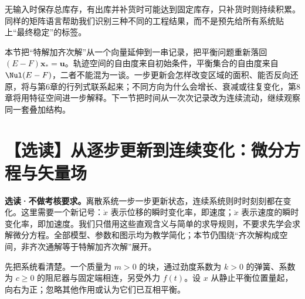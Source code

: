 \documentclass[a4paper,12pt,twoside,openany,fontset=none]{ctexbook}
\renewcommand{\geq}{\geqslant}
\numberwithin{equation}{chapter}
\begin{document}
无输入时保存总库存，有出库并补货时可能达到固定库存，只补货时则持续积累。同样的矩阵语言帮助我们识别三种不同的工程结果，而不是预先给所有系统贴上“最终稳定”的标签。


本节把“特解加齐次解”从一个向量延伸到一串记录，把平衡问题重新落回 $(E-F)\boldsymbol x_*=\boldsymbol u$。轨迹空间的自由度来自初始条件，平衡集合的自由度来自 $\Nul(E-F)$，二者不能混为一谈。一步更新会怎样改变区域的面积、能否反向还原，将与第6章的行列式联系起来；不同方向为什么会增长、衰减或往复变化，第8章将用特征空间进一步解释。下一节把时间从一次次记录改为连续流动，继续观察同一套叠加结构。
\FloatBarrier
\clearpage

\section{【选读】从逐步更新到连续变化：微分方程与矢量场}
\label{sec:five-continuous}

\textbf{选读·不做考核要求。}离散系统一步一步更新状态，连续系统则时时刻刻都在变化。这里需要一个新记号：$\dot x$ 表示位移的瞬时变化率，即速度；$\ddot x$ 表示速度的瞬时变化率，即加速度。我们只借用这些直观含义与简单的求导规则，不要求先学会求解微分方程。全部模型、参数和图示均为教学简化；本节仍围绕“齐次解构成空间，非齐次通解等于特解加齐次解”展开。

先把系统看清楚。一个质量为 $m>0$ 的块，通过劲度系数为 $k>0$ 的弹簧、系数为 $c\geq0$ 的阻尼器与固定端相连，另受外力 $f(t)$。设 $x$ 从静止平衡位置量起，向右为正；忽略其他作用或认为它们已互相平衡。
\end{document}
